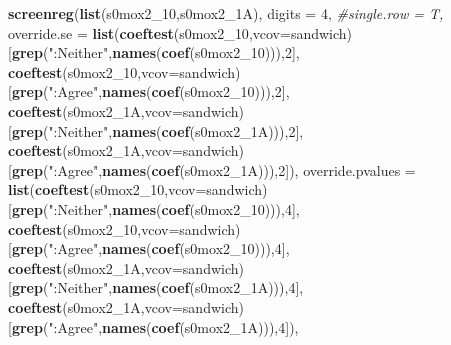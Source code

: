\documentclass[
]{article}
\newenvironment{Shaded}{\begin{snugshade}}{\end{snugshade}}
\newcommand{\CommentTok}[1]{\textcolor[rgb]{0.56,0.35,0.01}{\textit{#1}}}
\newcommand{\DataTypeTok}[1]{\textcolor[rgb]{0.13,0.29,0.53}{#1}}
\newcommand{\DecValTok}[1]{\textcolor[rgb]{0.00,0.00,0.81}{#1}}
\newcommand{\KeywordTok}[1]{\textcolor[rgb]{0.13,0.29,0.53}{\textbf{#1}}}
\newcommand{\NormalTok}[1]{#1}
\newcommand{\StringTok}[1]{\textcolor[rgb]{0.31,0.60,0.02}{#1}}
\begin{document}
\begin{Shaded}
\begin{Highlighting}[]
\KeywordTok{screenreg}\NormalTok{(}\KeywordTok{list}\NormalTok{(s0mox2_}\DecValTok{10}\NormalTok{,s0mox2_1A), }\DataTypeTok{digits =} \DecValTok{4}\NormalTok{, }\CommentTok{#single.row = T,}
          \DataTypeTok{override.se =} \KeywordTok{list}\NormalTok{(}\KeywordTok{coeftest}\NormalTok{(s0mox2_}\DecValTok{10}\NormalTok{,}\DataTypeTok{vcov=}\NormalTok{sandwich)[}\KeywordTok{grep}\NormalTok{(}\StringTok{":Neither"}\NormalTok{,}\KeywordTok{names}\NormalTok{(}\KeywordTok{coef}\NormalTok{(s0mox2_}\DecValTok{10}\NormalTok{))),}\DecValTok{2}\NormalTok{],}
                             \KeywordTok{coeftest}\NormalTok{(s0mox2_}\DecValTok{10}\NormalTok{,}\DataTypeTok{vcov=}\NormalTok{sandwich)[}\KeywordTok{grep}\NormalTok{(}\StringTok{":Agree"}\NormalTok{,}\KeywordTok{names}\NormalTok{(}\KeywordTok{coef}\NormalTok{(s0mox2_}\DecValTok{10}\NormalTok{))),}\DecValTok{2}\NormalTok{],}
                             \KeywordTok{coeftest}\NormalTok{(s0mox2_1A,}\DataTypeTok{vcov=}\NormalTok{sandwich)[}\KeywordTok{grep}\NormalTok{(}\StringTok{":Neither"}\NormalTok{,}\KeywordTok{names}\NormalTok{(}\KeywordTok{coef}\NormalTok{(s0mox2_1A))),}\DecValTok{2}\NormalTok{],}
                             \KeywordTok{coeftest}\NormalTok{(s0mox2_1A,}\DataTypeTok{vcov=}\NormalTok{sandwich)[}\KeywordTok{grep}\NormalTok{(}\StringTok{":Agree"}\NormalTok{,}\KeywordTok{names}\NormalTok{(}\KeywordTok{coef}\NormalTok{(s0mox2_1A))),}\DecValTok{2}\NormalTok{]),}
          \DataTypeTok{override.pvalues =} \KeywordTok{list}\NormalTok{(}\KeywordTok{coeftest}\NormalTok{(s0mox2_}\DecValTok{10}\NormalTok{,}\DataTypeTok{vcov=}\NormalTok{sandwich)[}\KeywordTok{grep}\NormalTok{(}\StringTok{":Neither"}\NormalTok{,}\KeywordTok{names}\NormalTok{(}\KeywordTok{coef}\NormalTok{(s0mox2_}\DecValTok{10}\NormalTok{))),}\DecValTok{4}\NormalTok{],}
                                  \KeywordTok{coeftest}\NormalTok{(s0mox2_}\DecValTok{10}\NormalTok{,}\DataTypeTok{vcov=}\NormalTok{sandwich)[}\KeywordTok{grep}\NormalTok{(}\StringTok{":Agree"}\NormalTok{,}\KeywordTok{names}\NormalTok{(}\KeywordTok{coef}\NormalTok{(s0mox2_}\DecValTok{10}\NormalTok{))),}\DecValTok{4}\NormalTok{],}
                                  \KeywordTok{coeftest}\NormalTok{(s0mox2_1A,}\DataTypeTok{vcov=}\NormalTok{sandwich)[}\KeywordTok{grep}\NormalTok{(}\StringTok{":Neither"}\NormalTok{,}\KeywordTok{names}\NormalTok{(}\KeywordTok{coef}\NormalTok{(s0mox2_1A))),}\DecValTok{4}\NormalTok{],}
                                  \KeywordTok{coeftest}\NormalTok{(s0mox2_1A,}\DataTypeTok{vcov=}\NormalTok{sandwich)[}\KeywordTok{grep}\NormalTok{(}\StringTok{":Agree"}\NormalTok{,}\KeywordTok{names}\NormalTok{(}\KeywordTok{coef}\NormalTok{(s0mox2_1A))),}\DecValTok{4}\NormalTok{]),}

\end{Highlighting}
\end{Shaded}
\end{document}
